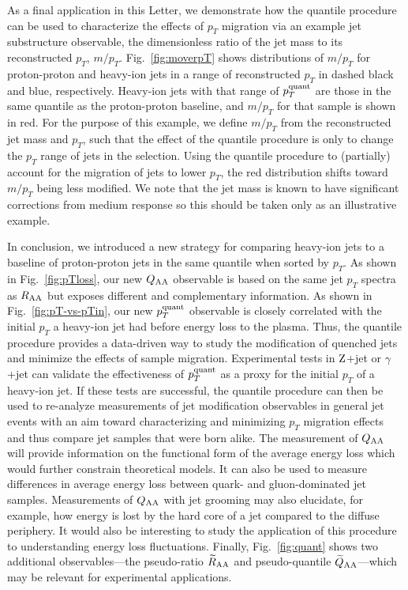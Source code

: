 \documentclass[aps,prl,twocolumn,preprintnumbers,superscriptaddress,showpacs,floatfix, nofootinbib]{revtex4-1}
\newcommand{\Z}{\rm Z}
\newcommand{\pTq}{p_T^{\rm quant}}
\newcommand{\Fig}[1]{Fig.~\ref{#1}}
\begin{document}
As a final application in this Letter, we demonstrate how the quantile procedure can be used to characterize the effects of $p_T$ migration via an example jet substructure observable, the dimensionless ratio of the jet mass to its reconstructed $p_T$, $m/p_T$.
%
\Fig{fig:moverpT} shows distributions of $m/p_T$ for proton-proton and heavy-ion jets in a range of reconstructed $p_T$ in dashed black and blue, respectively.
%
Heavy-ion jets with that range of $\pTq$ are those in the same quantile as the proton-proton baseline, and $m/p_T$ for that sample is shown in red.
%
For the purpose of this example, we define $m/p_T$ from the reconstructed jet mass and $p_T$, such that the effect of the quantile procedure is only to change the $p_T$ range of jets in the selection.
%
Using the quantile procedure to (partially) account for the migration of jets to lower $p_T$, the red distribution shifts toward $m/p_T$ being less modified.
% 
We note that the jet mass is known to have significant corrections from medium response \cite{KunnawalkamElayavalli:2017hxo,Park:2018acg} so this should be taken only as an illustrative example.


In conclusion, we introduced a new strategy for comparing heavy-ion jets to a baseline of proton-proton jets in the same quantile when sorted by $p_T$. 
%
As shown in \Fig{fig:pTloss}, our new $Q_{\rm AA}$ observable is based on the same jet $p_T$ spectra as $R_{\rm AA}$ but exposes different and complementary information. 
%
As shown in \Fig{fig:pT-vs-pTin}, our new $\pTq$ observable is closely correlated with the initial $p_T$ a heavy-ion jet had before energy loss to the plasma.
%
Thus, the quantile procedure provides a data-driven way to study the modification of quenched jets and minimize the effects of sample migration.
%
Experimental tests in $\Z$+jet or $\gamma$+jet can validate the effectiveness of $\pTq$ as a proxy for the initial $p_T$ of a heavy-ion jet.
%
If these tests are successful, the quantile procedure can then be used to re-analyze measurements of jet modification observables in general jet events with an aim toward characterizing and minimizing $p_T$ migration effects and thus compare jet samples that were born alike. 
%
The measurement of $Q_{\rm AA}$ will provide information on the functional form of the average energy loss which would further constrain theoretical models.
%
It can also be used to measure differences in average energy loss between quark- and gluon-dominated jet samples.
%
Measurements of $Q_{\rm AA}$ with jet grooming \cite{Butterworth:2008iy,Ellis:2009me,Krohn:2009th,Dasgupta:2013ihk,Larkoski:2014wba} may also elucidate, for example, how energy is lost by the hard core of a jet compared to the diffuse periphery.
%
It would also be interesting to study the application of this procedure to understanding energy loss fluctuations.
%
Finally, \Fig{fig:quant} shows two additional observables---the pseudo-ratio $\widetilde{R}_{\rm AA}$ and pseudo-quantile $\widetilde{Q}_{\rm AA}$---which may be relevant for experimental applications.
\end{document}
